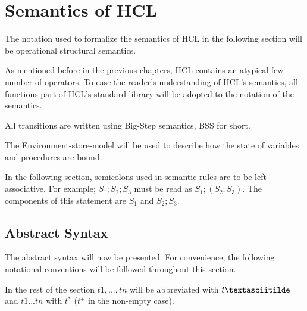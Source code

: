 
\section{Semantics of HCL}

The notation used to formalize the semantics of HCL in the following section will be operational structural semantics.

As mentioned before in the previous chapters, HCL contains an atypical few number of operators.
To ease the reader's understanding of HCL's semantics, all functions part of HCL's standard library will be adopted to the notation of the semantics. 

All transitions are written using Big-Step semantics, BSS for short.

The Environment-store-model will be used to describe how the state of variables and procedures are bound.

In the following section, semicolons used in semantic rules are to be left associative.
For example; $S_1;S_2;S_3$ must be read as $S_1;(S_2;S_3)$.
The components of this statement are $S_1$ and $S_2;S_3$.

\subsection{Abstract Syntax}
The abstract syntax will now be presented.
For convenience, the following notational conventions will be followed throughout this section.

In the rest of the section $t1, .
.
.
 , tn$ will be abbreviated with $t\textasciitilde$ and $t1 .
 .
 .
  tn$ with $t^*$ ($t^+$ in the non-empty case).

